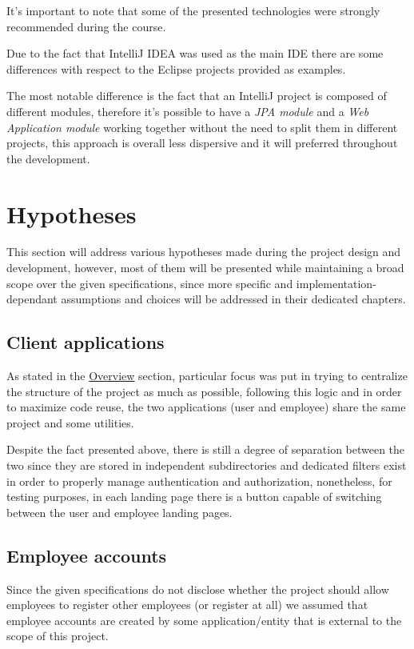 It's important to note that some of the presented technologies were strongly recommended during the course. 

Due to the fact that IntelliJ IDEA was used as the main IDE there are some differences with respect to the Eclipse projects provided as examples. 

The most notable difference is the fact that an IntelliJ project is composed of different modules, therefore it's possible to have a \textit{JPA module} and a \textit{Web Application module} working together without the need to split them in different projects, this approach is overall less dispersive and it will preferred throughout the development.


\section{Hypotheses}
\label{sec:hypoteses}

This section will address various hypotheses made during the project design and development, however, most of them will be presented while maintaining a broad scope over the given specifications, since more specific and implementation-dependant assumptions and choices will be addressed in their dedicated chapters. 

\subsection*{Client applications}

As stated in the \hyperref[sec:overview]{Overview} section, particular focus was put in trying to centralize the structure of the project as much as possible, following this logic and in order to maximize code reuse, the two applications (user and employee) share the same project and some utilities.

Despite the fact presented above, there is still a degree of separation between the two since they are stored in independent subdirectories and dedicated filters exist in order to properly manage authentication and authorization, nonetheless, for testing purposes, in each landing page there is a button capable of switching between the user and employee landing pages.

\subsection*{Employee accounts}

Since the given specifications do not disclose whether the project should allow employees to register other employees (or register at all) we assumed that employee accounts are created by some application/entity that is external to the scope of this project.

